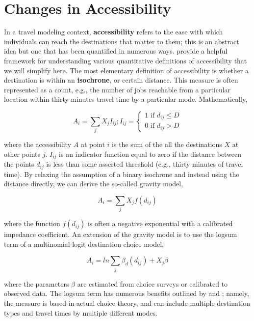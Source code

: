 \section{Changes in Accessibility}
In a travel modeling context, \textbf{accessibility} refers to the ease
with which
individuals can reach the destinations that matter to them; this is an
abstract
idea but one that has been quantified in numerous ways. \citet{dong2006}
provide a
helpful framework for understanding various quantitative definitions of
accessibility that we will simplify here. The most elementary definition of
accessibility is whether a destination is within an \textbf{isochrone}, or
certain
distance. This measure is often represented as a count, e.g., the number
of jobs
reachable from a particular location within thirty minutes travel time by a
particular mode. Mathematically,

\begin{equation}
A_i = \sum_{j} X_j I_{ij}; I_{ij} = \begin{cases}  1 \text{ if } d_{ij}
\leq D\\
0 \text{ if } d_{ij} > D \end{cases}
	\label{eqn:isochrone}
\end{equation}

\noindent where the accessibility \(A\) at point \(i\) is the sum of the all the
destinations \(X\) at other points \(j\). \(I_{ij}\) is an indicator
function equal to
zero if the distance between the points $d_{ij}$ is less than some asserted
threshold (e.g., thirty minutes of travel time). By relaxing the
assumption of a
binary isochrone and instead using the distance directly, we can derive the
so-called gravity model,

\begin{equation}
A_i = \sum_{j} X_j f(d_{ij})
  \label{eqn::gravity}
\end{equation}

\noindent where the function $f(d_{ij})$ is often a negative exponential with a
calibrated
impedance coefficient. An extension of the gravity model is to use the
logsum
term of a multinomial logit destination choice model,

\begin{equation}
A_i = ln\sum_{j} \beta_d(d_{ij}) + X_j\beta
  \label{eqn:logsum1}
\end{equation}

\noindent where the parameters $\beta$ are estimated from choice surveys or
calibrated to
observed data. The logsum term has numerous benefits outlined by
\citet{handy1997}
and \citet{geurs2004}; namely, the measure is based in actual choice
theory, and
can include multiple destination types and travel times by multiple
different modes.

